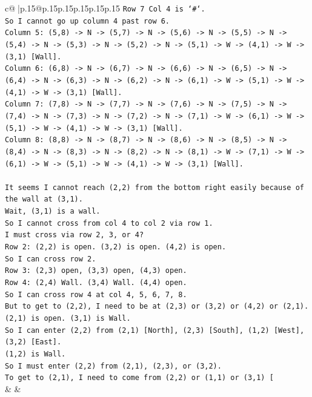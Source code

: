\documentclass{article}
\begin{document}
{\begin{supertabular}{c@{$\;$}|p{.15\linewidth}@{}p{.15\linewidth}p{.15\linewidth}p{.15\linewidth}p{.15\linewidth}p{.15\linewidth}}
{{{\texttt{Row 7 Col 4 is `\#`.} \\
\texttt{So I cannot go up column 4 past row 6.} \\
\texttt{Column 5: (5,8) {-}> N {-}> (5,7) {-}> N {-}> (5,6) {-}> N {-}> (5,5) {-}> N {-}> (5,4) {-}> N {-}> (5,3) {-}> N {-}> (5,2) {-}> N {-}> (5,1) {-}> W {-}> (4,1) {-}> W {-}> (3,1) {[}Wall{]}.} \\
\texttt{Column 6: (6,8) {-}> N {-}> (6,7) {-}> N {-}> (6,6) {-}> N {-}> (6,5) {-}> N {-}> (6,4) {-}> N {-}> (6,3) {-}> N {-}> (6,2) {-}> N {-}> (6,1) {-}> W {-}> (5,1) {-}> W {-}> (4,1) {-}> W {-}> (3,1) {[}Wall{]}.} \\
\texttt{Column 7: (7,8) {-}> N {-}> (7,7) {-}> N {-}> (7,6) {-}> N {-}> (7,5) {-}> N {-}> (7,4) {-}> N {-}> (7,3) {-}> N {-}> (7,2) {-}> N {-}> (7,1) {-}> W {-}> (6,1) {-}> W {-}> (5,1) {-}> W {-}> (4,1) {-}> W {-}> (3,1) {[}Wall{]}.} \\
\texttt{Column 8: (8,8) {-}> N {-}> (8,7) {-}> N {-}> (8,6) {-}> N {-}> (8,5) {-}> N {-}> (8,4) {-}> N {-}> (8,3) {-}> N {-}> (8,2) {-}> N {-}> (8,1) {-}> W {-}> (7,1) {-}> W {-}> (6,1) {-}> W {-}> (5,1) {-}> W {-}> (4,1) {-}> W {-}> (3,1) {[}Wall{]}.} \\
\\ 
\texttt{It seems I cannot reach (2,2) from the bottom right easily because of the wall at (3,1).} \\
\texttt{Wait, (3,1) is a wall.} \\
\texttt{So I cannot cross from col 4 to col 2 via row 1.} \\
\texttt{I must cross via row 2, 3, or 4?} \\
\texttt{Row 2: (2,2) is open. (3,2) is open. (4,2) is open.} \\
\texttt{So I can cross row 2.} \\
\texttt{Row 3: (2,3) open, (3,3) open, (4,3) open.} \\
\texttt{Row 4: (2,4) Wall. (3,4) Wall. (4,4) open.} \\
\texttt{So I can cross row 4 at col 4, 5, 6, 7, 8.} \\
\texttt{But to get to (2,2), I need to be at (2,3) or (3,2) or (4,2) or (2,1).} \\
\texttt{(2,1) is open. (3,1) is Wall.} \\
\texttt{So I can enter (2,2) from (2,1) {[}North{]}, (2,3) {[}South{]}, (1,2) {[}West{]}, (3,2) {[}East{]}.} \\
\texttt{(1,2) is Wall.} \\
\texttt{So I must enter (2,2) from (2,1), (2,3), or (3,2).} \\
\texttt{To get to (2,1), I need to come from (2,2) or (1,1) or (3,1) {[}} \\
            }
        }
    }
    & & \\ \\


\end{supertabular}}
\end{document}
